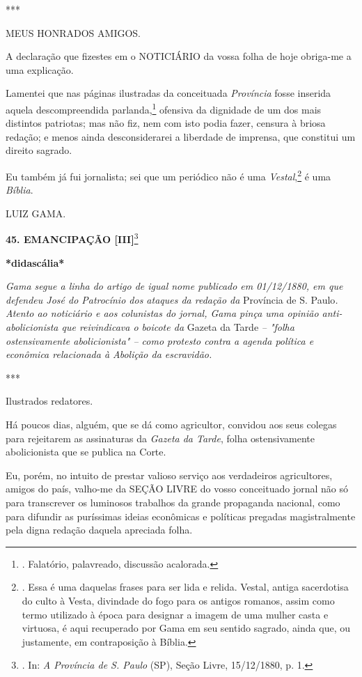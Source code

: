 ***

MEUS HONRADOS AMIGOS.

A declaração que fizestes em o NOTICIÁRIO da vossa folha de hoje
obriga-me a uma explicação.

Lamentei que nas páginas ilustradas da conceituada \emph{Província}
fosse inserida aquela descompreendida parlanda,\footnote{. Falatório,
  palavreado, discussão acalorada.} ofensiva da dignidade de um dos mais
distintos patriotas; mas não fiz, nem com isto podia fazer, censura à
briosa redação; e menos ainda desconsiderarei a liberdade de imprensa,
que constitui um direito sagrado.

Eu também já fui jornalista; sei que um periódico não é uma
\emph{Vestal},\footnote{. Essa é uma daquelas frases para ser lida e
  relida. Vestal, antiga sacerdotisa do culto à Vesta, divindade do fogo
  para os antigos romanos, assim como termo utilizado à época para
  designar a imagem de uma mulher casta e virtuosa, é aqui recuperado
  por Gama em seu sentido sagrado, ainda que, ou justamente, em
  contraposição à Bíblia.}
é uma \emph{Bíblia}.

LUIZ GAMA.

\textbf{45. EMANCIPAÇÃO {[}III{]}}\footnote{. In: \emph{A Província de
  S. Paulo} (SP), Seção Livre, 15/12/1880, p. 1.}

\textbf{*}\textbf{didascália*}

\emph{Gama segue a linha do artigo de igual nome publicado em
01/12/1880, em que defendeu José do Patrocínio dos ataques da redação
da} Província de S. Paulo\emph{. Atento ao noticiário e aos colunistas
do jornal, Gama pinça uma opinião anti-abolicionista que reivindicava o
boicote da} Gazeta da Tarde \emph{-- "folha ostensivamente
abolicionista" -- como protesto contra a agenda política e econômica
relacionada à Abolição da escravidão. }

***

Ilustrados redatores.

Há poucos dias, alguém, que se dá como agricultor, convidou aos seus
colegas para rejeitarem as assinaturas da \emph{Gazeta da Tarde}, folha
ostensivamente abolicionista que se publica na Corte.

Eu, porém, no intuito de prestar valioso serviço aos verdadeiros
agricultores, amigos do país, valho-me da SEÇÃO LIVRE do vosso
conceituado jornal não só para transcrever os luminosos trabalhos da
grande propaganda nacional, como para difundir as puríssimas ideias
econômicas e políticas pregadas magistralmente pela digna redação
daquela apreciada folha.

